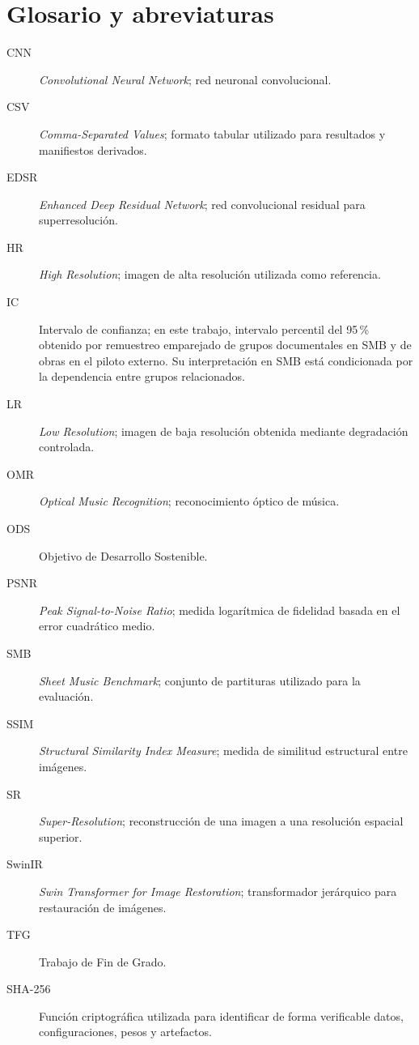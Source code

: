 \chapter*{Glosario y abreviaturas}

\begin{description}
  \item[CNN] \emph{Convolutional Neural Network}; red neuronal convolucional.
  \item[CSV] \emph{Comma-Separated Values}; formato tabular utilizado para resultados y
        manifiestos derivados.
  \item[EDSR] \emph{Enhanced Deep Residual Network}; red convolucional residual para
        superresolución.
  \item[HR] \emph{High Resolution}; imagen de alta resolución utilizada como referencia.
  \item[IC] Intervalo de confianza; en este trabajo, intervalo percentil del 95\,\% obtenido por
        remuestreo emparejado de grupos documentales en SMB y de obras en el piloto externo.
        Su interpretación en SMB está condicionada por la dependencia entre grupos relacionados.
  \item[LR] \emph{Low Resolution}; imagen de baja resolución obtenida mediante degradación
        controlada.
  \item[OMR] \emph{Optical Music Recognition}; reconocimiento óptico de música.
  \item[ODS] Objetivo de Desarrollo Sostenible.
  \item[PSNR] \emph{Peak Signal-to-Noise Ratio}; medida logarítmica de fidelidad basada en el
        error cuadrático medio.
  \item[SMB] \emph{Sheet Music Benchmark}; conjunto de partituras utilizado para la evaluación.
  \item[SSIM] \emph{Structural Similarity Index Measure}; medida de similitud estructural entre
        imágenes.
  \item[SR] \emph{Super-Resolution}; reconstrucción de una imagen a una resolución espacial
        superior.
  \item[SwinIR] \emph{Swin Transformer for Image Restoration}; transformador jerárquico para
        restauración de imágenes.
  \item[TFG] Trabajo de Fin de Grado.
  \item[SHA-256] Función criptográfica utilizada para identificar de forma verificable datos,
        configuraciones, pesos y artefactos.
\end{description}
